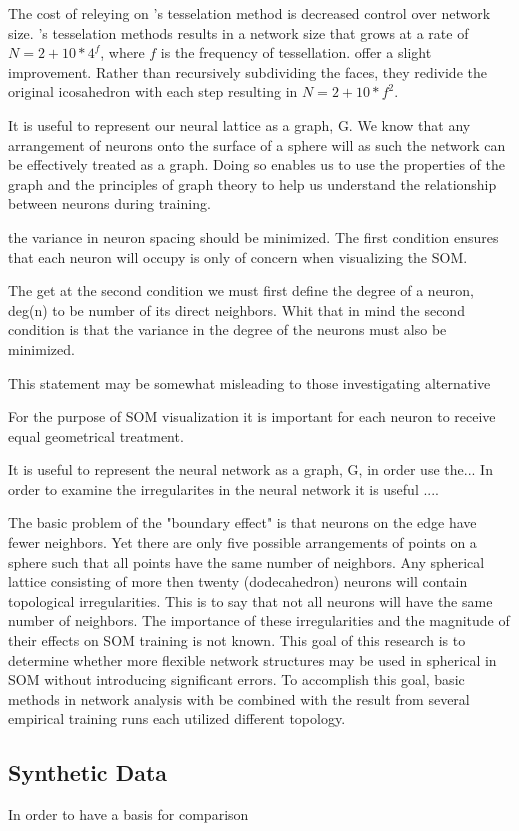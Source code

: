 \documentclass[11pt]{article}
\begin{document}
The cost of releying on \citeauthor{ritter99}'s tesselation method is decreased
control over network size. \citeauthor{ritter99}'s tesselation methods results
in a network size that grows at a rate of \(N=2+10*4^f\), where $f$ is the
frequency of tessellation. \cite{wu2006} offer a slight improvement. Rather than
recursively subdividing the faces, they redivide the original icosahedron with
each step resulting in \(N=2+10*f^2\).


It is useful to represent our neural lattice as a graph, G.
We know that any arrangement of neurons onto the surface of a sphere will as such the network can be effectively treated as a graph.  Doing so enables us to use the properties of the graph and the principles of graph theory to help us understand the relationship between neurons during training.

the variance in neuron spacing should be minimized.    The first condition ensures that each neuron will occupy is only of concern when visualizing the SOM.



The get at the second condition we must first define the degree of a neuron, deg(n) to be number of its direct neighbors.  Whit that in mind the second condition is that the variance in the degree of the neurons must also be minimized.


This statement may be somewhat misleading to those investigating alternative 


For the purpose of SOM visualization it is important for each neuron to receive equal geometrical treatment.


It is useful to represent the neural network as a graph, G, in order use the...
In order to examine the irregularites in the neural network it is useful ....



The basic problem of the "boundary effect" is that neurons on the edge have fewer neighbors. Yet there are only five possible arrangements of points on a sphere such that all points have the same number of neighbors.  Any spherical lattice consisting of more then twenty (dodecahedron) neurons will contain topological irregularities.  This is to say that not all neurons will have the same number of neighbors.  The importance of these irregularities and the magnitude of their effects on SOM training is not known.  This goal of this research is to determine whether more flexible network structures may be used in spherical in SOM without introducing significant errors. To accomplish this goal, basic methods in network analysis with be combined with the result from several empirical training runs each utilized different topology.  

\subsection{Synthetic Data}
In order to have a basis for comparison 




\end{document}

